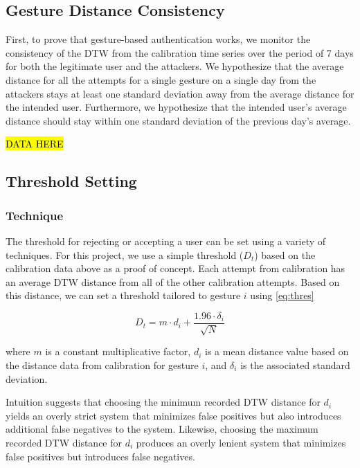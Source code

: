 \subsection{Gesture Distance Consistency}

First, to prove that gesture-based authentication works, we monitor the consistency of the \gls{DTW} from the calibration time series over the period of 7 days for both the legitimate user and the attackers. We hypothesize that the average distance for all the attempts for a single gesture on a single day from the attackers stays at least one standard deviation away from the average distance for the intended user. Furthermore, we hypothesize that the intended user's average distance should stay within one standard deviation of the previous day's average.

\hl{DATA HERE}

\subsection{Threshold Setting}

\subsubsection{Technique}

The threshold for rejecting or accepting a user can be set using a variety of techniques. For this project, we use a simple threshold ($D_{t}$) based on the calibration data above as a proof of concept. Each attempt from calibration has an average \gls{DTW} distance from all of the other calibration attempts. Based on this distance, we can set a threshold tailored to gesture $i$ using \autoref{eq:thres}

\begin{equation}
D_{t} = m \cdot d_{i} + \frac{1.96 \cdot \delta_{i}}  {\sqrt{N}}
\label{eq:thres}
\end{equation}

\noindent where $m$ is a constant multiplicative factor, $d_{i}$ is a mean distance value based on the distance data from calibration for gesture $i$, and $\delta_{i}$ is the associated standard deviation.

Intuition suggests that choosing the minimum recorded \gls{DTW} distance for $d_{i}$ yields an overly strict system that minimizes false positives but also introduces additional false negatives to the system. Likewise, choosing the maximum recorded \gls{DTW} distance for $d_{i}$ produces an overly lenient system that minimizes false positives but introduces false negatives. 


